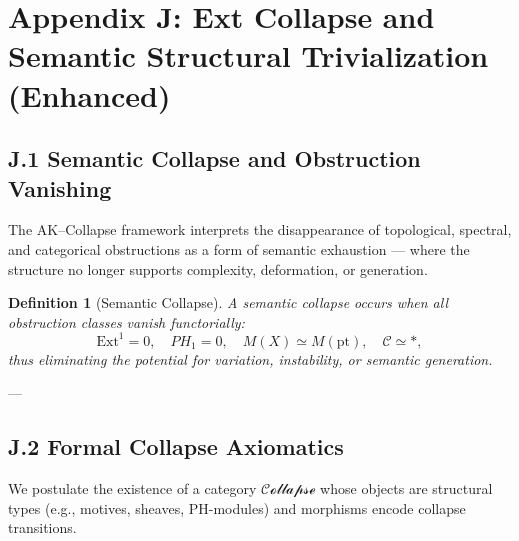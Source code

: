 \documentclass[11pt]{article}
\newtheorem{definition}[theorem]{Definition}
\begin{document}

\section*{Appendix J: Ext Collapse and Semantic Structural Trivialization (Enhanced)}

\subsection*{J.1 Semantic Collapse and Obstruction Vanishing}

The AK–Collapse framework interprets the disappearance of topological, spectral, and categorical obstructions  
as a form of semantic exhaustion — where the structure no longer supports complexity, deformation, or generation.

\begin{definition}[Semantic Collapse]
A semantic collapse occurs when all obstruction classes vanish functorially:
\[
\mathrm{Ext}^1 = 0, \quad PH_1 = 0, \quad M(X) \simeq M(\mathrm{pt}), \quad \mathcal{C} \simeq \ast,
\]
thus eliminating the potential for variation, instability, or semantic generation.
\end{definition}

---

\subsection*{J.2 Formal Collapse Axiomatics}

We postulate the existence of a category $\mathcal{Collapse}$ whose objects are structural types (e.g., motives, sheaves, PH-modules)  
and morphisms encode collapse transitions.
\end{document}
